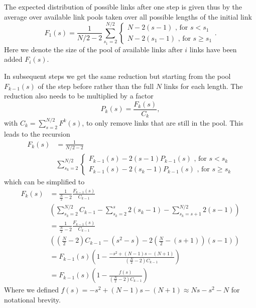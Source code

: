 \documentclass[
reprint,
twocolumn,
amsmath,amssymb,superscriptaddress,aps,
pre]{revtex4-1}
\begin{document}
The expected distribution of possible links after one step is given thus by the average over available link pools taken over all possible lengths of the initial link
\begin{equation}
    F_1(s)= \frac{1}{N/2-2} \sum_{s_1=2}^{N/2} { \begin{cases}
    N-2(s-1) \text{ , for } s<s_1\\
    N-2(s_1 -1)\text{ , for } s\geq s_1
    \end{cases}}.
\end{equation}
Here we denote the size of the pool of available links after $i$ links have been added $F_i(s)$.

In subsequent steps we get the same reduction but starting from the pool $F_{k-1}(s)$ of the step before rather than the full $N$ links for each length. The reduction also needs to be multiplied by a factor 
\begin{equation}
    P_k(s)=\frac{F_k(s)}{C_k},
    \label{eq.Pk}
\end{equation}
with $C_k=\sum_{s=2}^{N/2}F^k(s)$, to only remove links that are still in the pool. This leads to the recursion
\begin{align}
    F_k(s)&= \frac{1}{N/2-2} \nonumber \\
    &\sum_{s_k=2}^{N/2} {\begin{cases}
     F_{k-1}(s)-2(s-1) P_{k-1}(s) \text{ , for } s<s_k\\
     F_{k-1}(s)-2(s_k -1)P_{k-1}(s)\text{ , for } s\geq s_k
    \end{cases}}
\end{align}
which can be simplified to
\begin{align}
   F_k(s)&= \frac{1}{\frac{N}{2}-2} \frac{F_{k-1}(s)}{C_{k-1}}\nonumber \\
   &\left( \sum_{s_k=2}^{N/2}C_{k-1} - \sum_{s_k=2}^{s} 2(s_k-1) - \sum_{s_k=s+1}^{N/2} 2(s -1) \right) \nonumber \\
   &= \frac{1}{\frac{N}{2}-2}\frac{F_{k-1}(s)}{C_{k-1}}\nonumber \\
   &\left(\left(\frac{N}{2}-2\right)C_{k-1} -(s^2-s)
   -2\left(\frac{N}{2}-(s+1)\right)(s-1)\right)  \nonumber \\
   &= F_{k-1}(s)\left(1-\frac{-s^2 +(N-1)s-(N+1)}{(\frac{N}{2}-2)C_{k-1}} \right)\nonumber \\
   &=F_{k-1}(s)\left(1-\frac{f(s)}{(\frac{N}{2}-2)C_{k-1}} \right)
   \label{eq.Fk_rec}
\end{align}
Where we defined $f(s)=-s^2 +(N-1)s-(N+1) \approx N s - s^2 - N$ for notational brevity.
\end{document}
